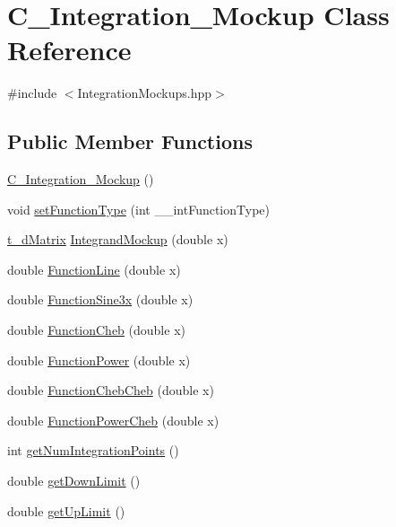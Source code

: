 \hypertarget{class_c___integration___mockup}{\section{C\-\_\-\-Integration\-\_\-\-Mockup Class Reference}
\label{class_c___integration___mockup}
}


{\ttfamily \#include $<$Integration\-Mockups.\-hpp$>$}

\subsection*{Public Member Functions}
\begin{DoxyCompactItemize}
\item 
\hyperlink{class_c___integration___mockup_a5cce9d870510d167ae8e52a0fc88b4d0}{C\-\_\-\-Integration\-\_\-\-Mockup} ()
\item 
void \hyperlink{class_c___integration___mockup_a277f0c63bed990b9c8beae175be845e6}{set\-Function\-Type} (int \-\_\-\-\_\-int\-Function\-Type)
\item 
\hyperlink{types_8h_a8d0da220940fc7baa5ba6b385e9b874e}{t\-\_\-d\-Matrix} \hyperlink{class_c___integration___mockup_a0cf4106561a8032a45ab56d346ca48ed}{Integrand\-Mockup} (double x)
\item 
double \hyperlink{class_c___integration___mockup_ae5fea8d5929f9e08bd8a520bc6fc007e}{Function\-Line} (double x)
\item 
double \hyperlink{class_c___integration___mockup_abe3f2f04b984ae16533e71fa75a3ac43}{Function\-Sine3x} (double x)
\item 
double \hyperlink{class_c___integration___mockup_a283bf7e4fa7926c5c309b3d05250857e}{Function\-Cheb} (double x)
\item 
double \hyperlink{class_c___integration___mockup_a6072270abf1e552a30b3b8eeaae56b57}{Function\-Power} (double x)
\item 
double \hyperlink{class_c___integration___mockup_ad0b2dc2666f3f535bb8de192dea15000}{Function\-Cheb\-Cheb} (double x)
\item 
double \hyperlink{class_c___integration___mockup_a98ac3a8fa83fd6696e34061aecd94e9c}{Function\-Power\-Cheb} (double x)
\item 
int \hyperlink{class_c___integration___mockup_ac29856604fcf4791fd4dd459ab8dd020}{get\-Num\-Integration\-Points} ()
\item 
double \hyperlink{class_c___integration___mockup_a2c945ead423a0e422a0e5d81dd6056fe}{get\-Down\-Limit} ()
\item 
double \hyperlink{class_c___integration___mockup_ae46f0b9c1ab11f106b54c54c200583b9}{get\-Up\-Limit} ()
\end{DoxyCompactItemize}


